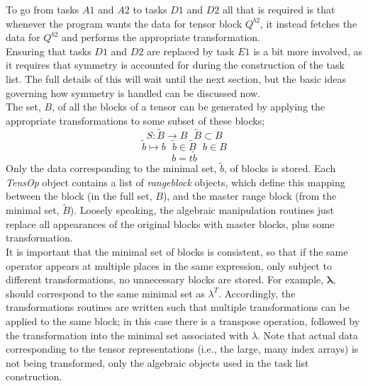 \noindent To go from tasks $A1$ and $A2$ to tasks $D1$ and $D2$ all that is
required is that whenever the program wants the data for tensor block $Q^{b2}$,
it instead fetches the data for $Q^{b2}$ and performs the appropriate
transformation.\\

\noindent Ensuring that tasks $D1$ and $D2$ are replaced by task
$E1$ is a bit more involved, as it requires that symmetry is accounted 
for during the construction of the task list. The full details of this
will wait until the next section, but the basic ideas governing 
how symmetry is handled can be discussed now.\\

\noindent The set, $B$, of all the blocks of a tensor can be generated by applying
the appropriate transformations to some subset of these blocks;
\begin{equation*}
S : \tilde{B} \rightarrow B  \text { \ \ \ } \tilde{B} \subset B
\end{equation*}
\begin{equation*}
   \tilde{b} \mapsto b   \text { \ \ \ } \tilde b\in \tilde{B} \text{ \ \ \ } b \in B
\end{equation*}
\begin{equation}
   b = t \tilde{b} 
\end{equation}
Only the data corresponding to the minimal set, $\tilde{b}$, of blocks is stored. 
Each \emph{TensOp} object contains a list of \emph{rangeblock} objects, which
define this mapping between the  block (in the full set, $B$), and
the master range block (from the minimal set, $\tilde{B}$). Loosely speaking,
the algebraic manipulation routines just replace all appearances of the original 
blocks with master blocks, plus some transformation.\\ 

\noindent It is important that the minimal set of blocks is consistent, so
that if the same operator appears at multiple places in the same expression, only
subject to different transformations, no unnecessary blocks are stored. For
example, $\mathbf{\lambda}$, should correspond to the same minimal
set as $\lambda^{T}$. Accordingly, the transformations routines are 
written such that multiple transformations can be applied to the same block; in this case
there is a transpose operation, followed by the transformation into the minimal set 
associated with $\lambda$. Note that actual data  corresponding to the tensor representations
(i.e., the large, many index arrays) is not being transformed, only the algebraic objects 
used in the task list construction.

